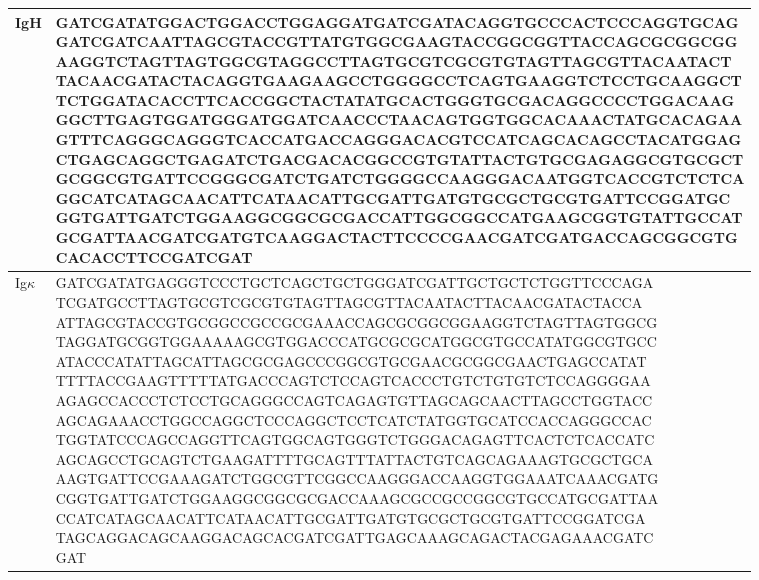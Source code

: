 \documentclass{article}%
\begin{document}
\begin{longtable}{p{.5cm}l}
\bottomrule
\endlastfoot
IgH &                                                                                                                \makecell[l]{GATCGATATGGACTGGACCTGGAGGATGATCGATACAGGTGCCCACTCCCAGGTGCAG \\ GATCGATCAATTAGCGTACCGTTATGTGGCGAAGTACCGGCGGTTACCAGCGCGGCGG \\ AAGGTCTAGTTAGTGGCGTAGGCCTTAGTGCGTCGCGTGTAGTTAGCGTTACAATACT \\ TACAACGATACTACAGGTGAAGAAGCCTGGGGCCTCAGTGAAGGTCTCCTGCAAGGCT \\ TCTGGATACACCTTCACCGGCTACTATATGCACTGGGTGCGACAGGCCCCTGGACAAG \\ GGCTTGAGTGGATGGGATGGATCAACCCTAACAGTGGTGGCACAAACTATGCACAGAA \\ GTTTCAGGGCAGGGTCACCATGACCAGGGACACGTCCATCAGCACAGCCTACATGGAG \\ CTGAGCAGGCTGAGATCTGACGACACGGCCGTGTATTACTGTGCGAGAGGCGTGCGCT \\ GCGGCGTGATTCCGGGCGATCTGATCTGGGGCCAAGGGACAATGGTCACCGTCTCTCA \\ GGCATCATAGCAACATTCATAACATTGCGATTGATGTGCGCTGCGTGATTCCGGATGC \\ GGTGATTGATCTGGAAGGCGGCGCGACCATTGGCGGCCATGAAGCGGTGTATTGCCAT \\ GCGATTAACGATCGATGTCAAGGACTACTTCCCCGAACGATCGATGACCAGCGGCGTG \\ CACACCTTCCGATCGAT} \\
\midrule
Ig$\kappa$ &  \makecell[l]{GATCGATATGAGGGTCCCTGCTCAGCTGCTGGGATCGATTGCTGCTCTGGTTCCCAGA \\ TCGATGCCTTAGTGCGTCGCGTGTAGTTAGCGTTACAATACTTACAACGATACTACCA \\ ATTAGCGTACCGTGCGGCCGCCGCGAAACCAGCGCGGCGGAAGGTCTAGTTAGTGGCG \\ TAGGATGCGGTGGAAAAAGCGTGGACCCATGCGCGCATGGCGTGCCATATGGCGTGCC \\ ATACCCATATTAGCATTAGCGCGAGCCCGGCGTGCGAACGCGGCGAACTGAGCCATAT \\ TTTTACCGAAGTTTTTATGACCCAGTCTCCAGTCACCCTGTCTGTGTCTCCAGGGGAA \\ AGAGCCACCCTCTCCTGCAGGGCCAGTCAGAGTGTTAGCAGCAACTTAGCCTGGTACC \\ AGCAGAAACCTGGCCAGGCTCCCAGGCTCCTCATCTATGGTGCATCCACCAGGGCCAC \\ TGGTATCCCAGCCAGGTTCAGTGGCAGTGGGTCTGGGACAGAGTTCACTCTCACCATC \\ AGCAGCCTGCAGTCTGAAGATTTTGCAGTTTATTACTGTCAGCAGAAAGTGCGCTGCA \\ AAGTGATTCCGAAAGATCTGGCGTTCGGCCAAGGGACCAAGGTGGAAATCAAACGATG \\ CGGTGATTGATCTGGAAGGCGGCGCGACCAAAGCGCCGCCGGCGTGCCATGCGATTAA \\ CCATCATAGCAACATTCATAACATTGCGATTGATGTGCGCTGCGTGATTCCGGATCGA \\ TAGCAGGACAGCAAGGACAGCACGATCGATTGAGCAAAGCAGACTACGAGAAACGATC \\ GAT} \\

\end{longtable}
\end{document}
